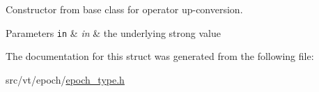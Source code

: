 Constructor from base class for operator up-\/conversion. 


\begin{DoxyParams}[1]{Parameters}
\mbox{\tt in}  & {\em in} & the underlying strong value \\
\hline
\end{DoxyParams}


The documentation for this struct was generated from the following file\+:\begin{DoxyCompactItemize}
\item 
src/vt/epoch/\hyperlink{epoch__type_8h}{epoch\+\_\+type.\+h}\end{DoxyCompactItemize}
